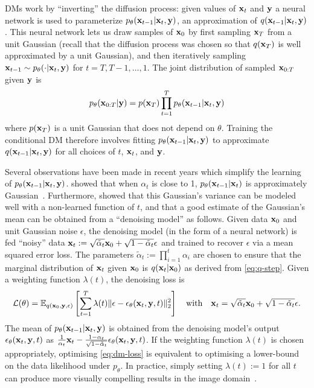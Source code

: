 DMs work by ``inverting'' the diffusion process: given values of ${\mathbf{x}}_t$ and ${\mathbf{y}}$ a neural network is used to parameterize $p_\theta({\mathbf{x}}_{t-1}|{\mathbf{x}}_t, {\mathbf{y}})$, an approximation of $q({\mathbf{x}}_{t-1}|{\mathbf{x}}_t,{\mathbf{y}})$. This neural network lets us draw samples of ${\mathbf{x}}_0$ by first sampling ${\mathbf{x}}_T$ from a unit Gaussian (recall that the diffusion process was chosen so that $q({\mathbf{x}}_T)$ is well approximated by a unit Gaussian), and then iteratively sampling ${\mathbf{x}}_{t-1} \sim p_\theta(\cdot|{\mathbf{x}}_t,{\mathbf{y}})$ for $t=T,T-1,\ldots,1$. The joint distribution of sampled ${\mathbf{x}}_{0:T}$ given ${\mathbf{y}}$ is
\begin{equation} \label{eq:p-joint}
    p_\theta({\mathbf{x}}_{0:T}|{\mathbf{y}}) = p({\mathbf{x}}_{T}) \prod_{t=1}^T p_\theta({\mathbf{x}}_{t-1}|{\mathbf{x}}_t, {\mathbf{y}})
\end{equation}
where $p({\mathbf{x}}_{T})$ is a unit Gaussian that does not depend on $\theta$. Training the conditional DM therefore involves fitting $p_\theta({\mathbf{x}}_{t-1}|{\mathbf{x}}_t,{\mathbf{y}})$ to approximate $q({\mathbf{x}}_{t-1}|{\mathbf{x}}_t, {\mathbf{y}})$ for all choices of $t$, ${\mathbf{x}}_t$, and ${\mathbf{y}}$.

Several observations have been made in recent years which simplify the learning of $p_\theta({\mathbf{x}}_{t-1}|{\mathbf{x}}_t,{\mathbf{y}})$. \citet{sohl2015deep} showed that when $\alpha_t$ is close to 1, $p_\theta({\mathbf{x}}_{t-1}|{\mathbf{x}}_t)$ is approximately Gaussian~\cite{sohl2015deep}. Furthermore, \citet{ho2020denoising} showed that this Gaussian's variance can be modeled well with a non-learned function of $t$, and that a good estimate of the Gaussian's mean can be obtained from a ``denoising model'' as follows. Given data ${\mathbf{x}}_0$ and unit Gaussian noise $\epsilon$, the denoising model (in the form of a neural network) is fed ``noisy'' data ${\mathbf{x}}_t := \sqrt{\tilde{\alpha}_t} {\mathbf{x}}_0 + \sqrt{1 - \tilde{\alpha}_t} \epsilon$ and trained to recover $\epsilon$ via a mean squared error loss. The parameters $\tilde{\alpha}_t := \prod_{i=1}^t \alpha_i$ are chosen to ensure that the marginal distribution of ${\mathbf{x}}_t$ given ${\mathbf{x}}_0$ is $q({\mathbf{x}}_t|{\mathbf{x}}_0)$ as derived from \cref{eq:q-step}. Given a weighting function $\lambda(t)$, the denoising loss is
\begin{equation} \label{eq:dm-loss}
    \mathcal{L}(\theta) = \mathbb{E}_{q({\mathbf{x}}_0, {\mathbf{y}}, \epsilon)} \left[ \sum_{t=1}^T \lambda(t) \lVert \epsilon - \epsilon_\theta({\mathbf{x}}_t, {\mathbf{y}}, t) \rVert_2^2 \right] \quad \text{with} \quad {\mathbf{x}}_t = \sqrt{\tilde{\alpha}_t} {\mathbf{x}}_0 + \sqrt{1 - \tilde{\alpha}_t} \epsilon.
\end{equation}
The mean of $p_\theta({\mathbf{x}}_{t-1}|{\mathbf{x}}_t,{\mathbf{y}})$ is obtained from the denoising model's output $\epsilon_\theta({\mathbf{x}}_t, {\mathbf{y}}, t)$ as ${\frac{1}{\alpha_t}{\mathbf{x}}_t - \frac{1-\alpha_t}{\sqrt{1-\tilde{\alpha}_t}}\epsilon_\theta({\mathbf{x}}_t, {\mathbf{y}}, t)}$.
If the weighting function $\lambda(t)$ is chosen appropriately, optimising \cref{eq:dm-loss} is equivalent to optimising a lower-bound on the data likelihood under $p_\theta$. In practice, simply setting $\lambda(t) := 1$ for all $t$ can produce more visually compelling results in the image domain~\citep{ho2020denoising}.

